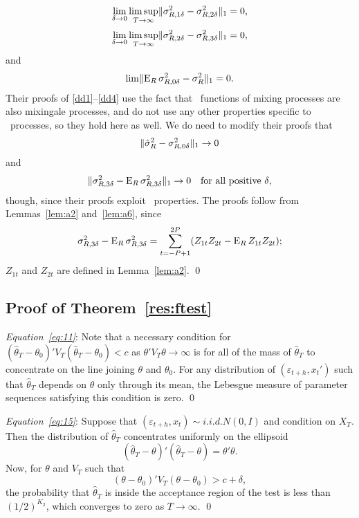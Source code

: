 \documentclass[11pt]{article}
\newcommand{\e}{\varepsilon}
\begin{document}
\begin{equation} \label{dd2}
\lim_{\delta\to0} \limsup_{T\to\infty} \lVert \sigma_{R,1\delta}^2 - \sigma_{R,2\delta}^{2}
\rVert_1 = 0,
\end{equation}
\begin{equation} \label{dd3}
\lim_{\delta\to0} \limsup_{T\to\infty} \lVert \sigma_{R,2\delta}^{2} - \sigma_{R,3\delta}^{2}
\rVert_1 = 0,  
\end{equation}
and
\begin{equation} \label{dd4}
\lim \lVert \operatorname{E}_R \sigma_{R,0\delta}^2 - \sigma_R^2 \rVert_1 = 0.
\end{equation}
Their proofs of \eqref{dd1}--\eqref{dd4} use the fact that \ned\
functions of mixing processes are also mixingale processes, and do not
use any other properties specific to \ned\ processes, so they hold
here as well.  We do need to modify their proofs that
\begin{equation}
  \label{eq:4} \lVert \hat{\sigma}_R^2 - \sigma_{R,0\delta}^2 \rVert_1 \to 0
\end{equation}
and
\begin{equation}
  \label{eq:5} \lVert \sigma_{R,3\delta}^{2} - \operatorname{E}_R \sigma_{R,3\delta}^{2} \rVert_1
  \to 0 \quad \text{for all positive $\delta$},
\end{equation}
though, since their proofs exploit \ned\ properties.  The proofs
follow from Lemmas~\ref{lem:a2} and~\ref{lem:a6}, since
\begin{equation*}
  \sigma_{R,3\delta}^{2} - \operatorname{E}_R \sigma_{R,3\delta}^{2} = \sum_{t=-P+1}^{2P} (Z_{1t}Z_{2t} - \operatorname{E}_R Z_{1t}Z_{2t});
\end{equation*}
$Z_{1t}$ and $Z_{2t}$ are defined in Lemma~\ref{lem:a2}.
\qed

\subsection*{Proof of Theorem~\ref{res:ftest}}

\textit{Equation~\eqref{eq:11}}: Note that a necessary condition for
$(\hat{\theta}_T - \theta_0)'V_T (\hat{\theta}_T - \theta_0) < c$
as $\theta'V_T\theta \to \infty$ is for all of the mass of
$\hat{\theta}_T$ to concentrate on the line joining $\theta$ and
$\theta_0$.  For any distribution of $(\e_{t+h}, x_t')$ such
that $\hat{\theta}_T$ depends on $\theta$ only through its mean, the
Lebesgue measure of parameter sequences satisfying this condition is
zero. \qed

\vspace{\baselineskip}
\noindent\textit{Equation~\eqref{eq:15}}:  Suppose that
$(\e_{t+h}, x_t) \sim i.i.d. N(0,I)$ and condition on $X_T$.
Then the distribution of $\hat{\theta}_{T}$ concentrates uniformly on
the ellipsoid
\begin{equation*}
  (\hat{\theta}_T - \theta)'(\hat{\theta}_T - \theta) = \theta'\theta.
\end{equation*}
Now, for $\theta$ and $V_T$ such that 
\begin{equation*}
  (\theta-\theta_0)' V_T (\theta-\theta_0) > c + \delta,
\end{equation*}
the probability that $\hat{\theta}_T$ is inside the acceptance region
of the test is less than $(1/2)^{K_2}$, which converges to zero as $T
\to \infty$. \qed
\end{document}
